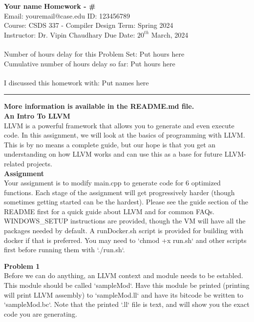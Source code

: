 \documentclass[a4paper, 11pt]{article}
\newenvironment{problem}[2][Problem]
    { \begin{mdframed}[backgroundcolor=gray!20] \textbf{#1 #2} \\}
    {  \end{mdframed}}
\begin{document}
\noindent
\large\textbf{Your name} \hfill \textbf{Homework - \#}   \\
Email: youremail@case.edu \hfill ID: 123456789 \\
\normalsize Course: CSDS 337 - Compiler Design \hfill Term: Spring 2024\\
Instructor: Dr. Vipin Chaudhary \hfill Due Date: $20^{th}$ March, 2024 \\ \\
Number of hours delay for this Problem Set: \hfill Put hours here\\
Cumulative number of hours delay so far: \hfill Put hours here \\ \\
I discussed this homework with: \hfill Put names here \\
\noindent\rule{7in}{2.8pt}

\large\textbf{More information is available in the README.md file. } \\

\large\textbf{An Intro To LLVM} \\
LLVM is a powerful framework that allows you to generate and even execute code. In this assignment, we will look at the basics of programming with LLVM. This is by no means a complete guide, but our hope is that you get an understanding on how LLVM works and can use this as a base for future LLVM-related projects. \\

\large\textbf{Assignment} \\
Your assignment is to modify main.cpp to generate code for 6 optimized functions.
Each stage of the assignment will get progressively harder (though sometimes getting started can be the hardest).
Please see the guide section of the README first for a quick guide about LLVM and for common FAQs.
WINDOWS\_SETUP instructions are provided, though the VM will have all the packages needed by default.
A runDocker.sh script is provided for building with docker if that is preferred.
You may need to `chmod +x run.sh` and other scripts first before running them with `./run.sh`. \\

\begin{problem}{1}
Before we can do anything, an LLVM context and module needs to be establed. This module should be called `sampleMod`. Have this module be printed (printing will print LLVM assembly) to `sampleMod.ll` and have its bitcode be written to `sampleMod.bc`. Note that the printed `.ll` file is text, and will show you the exact code you are generating.

\end{problem}
\end{document}
